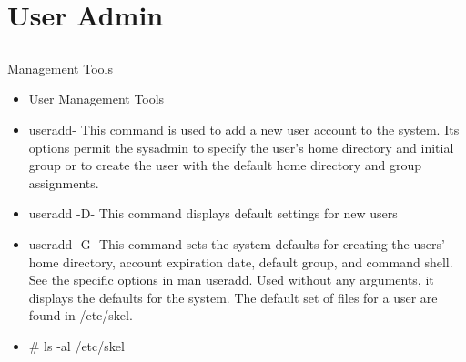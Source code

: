 \documentclass{beamer}
\begin{document}


\section{User Admin}
\subsection{}
\begin{frame}{Management Tools}
\begin{itemize}
\item User Management Tools
\item useradd- This command is used to add a new user account to the system. Its options permit the sysadmin to specify the user's home directory and initial group or to create the user with the default home directory and group assignments.
\item useradd -D- This command displays default settings for new users
\item useradd -G- This command sets the system defaults for creating the users' home directory, account expiration date, default group, and command shell. See the specific options in man useradd. Used without any arguments, it displays the defaults for the system. The default set of files for a user are found in /etc/skel.
\item \# ls -al /etc/skel
\end{itemize}
\end{frame}
\end{document}
